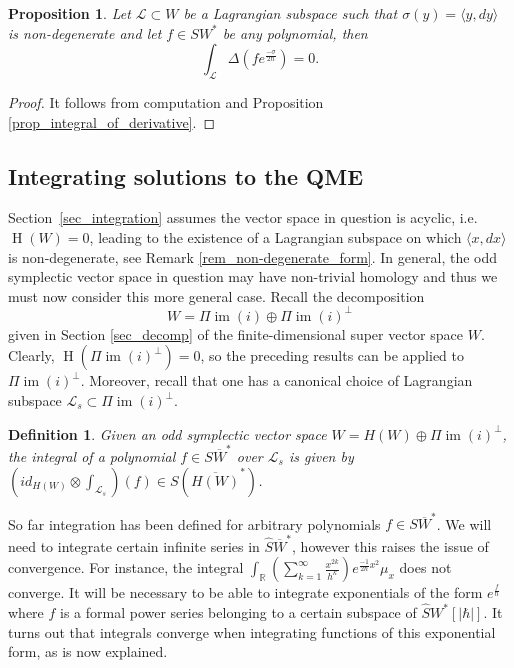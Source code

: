 \documentclass[]{amsart}
\newtheorem{proposition}[theorem]{Proposition}
\newtheorem{definition}[theorem]{Definition}
\theoremstyle{definition}
\newcommand{\im}{\operatorname{im}}
\newcommand{\homology}{\operatorname{H}}
\begin{document}
\begin{proposition}\label{prop_BV_stokes}
Let $\mathcal{L}\subset W$ be a Lagrangian subspace such that $\sigma(y)=\langle y,dy \rangle$ is non-degenerate and let $f\in S W^*$ be any polynomial, then
\[
\int_{\mathcal{L}} \Delta \left(f e^{\frac{-\sigma}{2\hbar}}\right) =0.
\]
\end{proposition}
\begin{proof}
It follows from computation and Proposition \ref{prop_integral_of_derivative}.
\end{proof}

\subsection{Integrating solutions to the QME}\label{sec_integrating_MC_elements}

Section~\ref{sec_integration} assumes the vector space in question is acyclic, i.e.~$\homology (W)=0$, leading to the existence of a Lagrangian subspace on which $\langle x, dx \rangle$ is non-degenerate, see Remark \ref{rem_non-degenerate_form}. In general, the odd symplectic vector space in question may have non-trivial homology and thus we must now consider this more general case. Recall the decomposition
\[
W=\Pi \im (i) \oplus \Pi \im(i)^\perp
\]
given in Section \ref{sec_decomp} of the finite-dimensional super vector space $W$. Clearly, $\homology (\Pi \im(i)^\perp)=0$, so the preceding results can be applied to $\Pi \im(i)^\perp$. Moreover, recall that one has a canonical choice of Lagrangian subspace $\mathcal{L}_s\subset\Pi \im(i)^\perp$.

\begin{definition}
Given an odd symplectic vector space $W=H(W)\oplus \Pi \im(i)^\perp$, the integral of a polynomial $f\in S\overline{W}^*$ over $\mathcal{L}_s$ is given by $(id_{H(W)}\otimes \int_{\mathcal{L}_s}) (f)\in S(\overline{H(W)}^*)$.
\end{definition}

So far integration has been defined for arbitrary polynomials $f\in S\overline{W}^*$. We will need to integrate certain infinite series in $\hat{S}\overline{W}^*$, however this raises the issue of convergence. For instance, the integral $ \int_\mathbb{R}\left (\sum_{k=1}^\infty \frac{x^{2k}}{h^k} \right ) e^{\frac{-1}{2\hbar}x^2}\mu_x$ does not converge. It will be necessary to be able to integrate exponentials of the form $e^{\frac{f}{\hbar}}$ where $f$ is a formal power series belonging to a certain subspace of $\hat{S}W^*[|\hbar|]$. It turns out that integrals converge when integrating functions of this exponential form, as is now explained.
\end{document}
